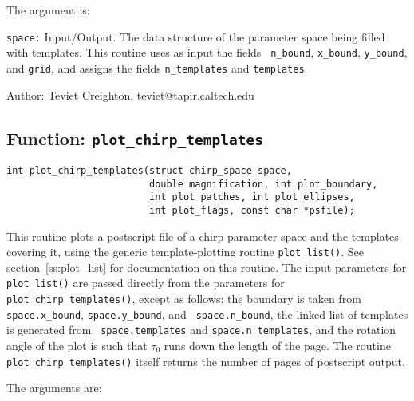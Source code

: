 The argument is:

\begin{description}
\item{\tt space:}
  Input/Output.  The data structure of the parameter space being
  filled with templates.  This routine uses as input the fields {\tt
  n\_bound}, {\tt x\_bound}, {\tt y\_bound}, and {\tt grid}, and
  assigns the fields {\tt n\_templates} and {\tt templates}.

\end{description}

\begin{description}
\item{Author:}
  Teviet Creighton, teviet@tapir.caltech.edu
\end{description}


\clearpage
\subsection{Function: {\tt plot\_chirp\_templates}}
\label{ss:plot_chirp_templates}

\begin{verbatim}
int plot_chirp_templates(struct chirp_space space,
                         double magnification, int plot_boundary,
                         int plot_patches, int plot_ellipses,
                         int plot_flags, const char *psfile);
\end{verbatim}

This routine plots a postscript file of a chirp parameter space and
the templates covering it, using the generic template-plotting routine
{\tt plot\_list()}.  See section~\ref{ss:plot_list} for documentation
on this routine.  The input parameters for {\tt plot\_list()} are
passed directly from the parameters for {\tt
plot\_chirp\_templates()}, except as follows: the boundary is taken
from {\tt space.x\_bound}, {\tt space.y\_bound}, and {\tt
space.n\_bound}, the linked list of templates is generated from {\tt
space.templates} and {\tt space.n\_templates}, and the rotation angle
of the plot is such that $\tau_0$ runs down the length of the page.
The routine {\tt plot\_chirp\_templates()} itself returns the number
of pages of postscript output.

The arguments are:

